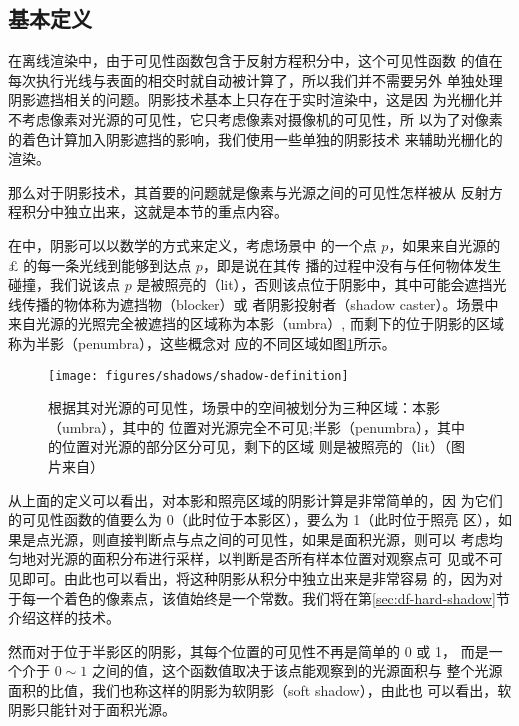 \subsection{基本定义}
在离线渲染中，由于可见性函数包含于反射方程积分中，这个可见性函数 的值在每次执行光线与表面的相交时就自动被计算了，所以我们并不需要另外 单独处理阴影遮挡相关的问题。阴影技术基本上只存在于实时渲染中，这是因 为光栅化并不考虑像素对光源的可见性，它只考虑像素对摄像机的可见性，所 以为了对像素的着色计算加入阴影遮挡的影响，我们使用一些单独的阴影技术 来辅助光栅化的渲染。

那么对于阴影技术，其首要的问题就是像素与光源之间的可见性怎样被从 反射方程积分中独立出来，这就是本节的重点内容。

在\cite{b:rts}中，阴影可以以数学的方式来定义，考虑场景中 的一个点 ${p}$，如果来自光源的 $\pounds$ 的每一条光线到能够到达点 ${p}$，即是说在其传 播的过程中没有与任何物体发生碰撞，我们说该点 ${p}$ 是被照亮的（lit），否则该点位于阴影中，其中可能会遮挡光线传播的物体称为遮挡物（blocker）或 者阴影投射者（shadow caster）。场景中来自光源的光照完全被遮挡的区域称为本影（umbra）, 而剩下的位于阴影的区域称为半影（penumbra），这些概念对 应的不同区域如图\ref{f:df-shadow-definition}所示。

\begin{figure}
\begin{center}
	\texttt{[image: figures/shadows/shadow-definition]}
	\end{center}
	\caption{根据其对光源的可见性，场景中的空间被划分为三种区域：本影（umbra），其中的 位置对光源完全不可见;半影（penumbra），其中的位置对光源的部分区分可见，剩下的区域 则是被照亮的（lit）（图片来自\cite{b:rts}）}
	\label{f:df-shadow-definition}
\end{figure}

从上面的定义可以看出，对本影和照亮区域的阴影计算是非常简单的，因 为它们的可见性函数的值要么为 0（此时位于本影区），要么为 1（此时位于照亮 区），如果是点光源，则直接判断点与点之间的可见性，如果是面积光源，则可以 考虑均匀地对光源的面积分布进行采样，以判断是否所有样本位置对观察点可 见或不可见即可。由此也可以看出，将这种阴影从积分中独立出来是非常容易 的，因为对于每一个着色的像素点，该值始终是一个常数。我们将在第\ref{sec:df-hard-shadow}节 介绍这样的技术。

然而对于位于半影区的阴影，其每个位置的可见性不再是简单的 0 或 1， 而是一个介于 $0\sim 1$ 之间的值，这个函数值取决于该点能观察到的光源面积与 整个光源面积的比值，我们也称这样的阴影为软阴影（soft shadow），由此也 可以看出，软阴影只能针对于面积光源。

